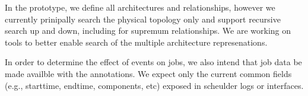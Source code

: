 In the prototype, we define all architectures and relationships,
however we currently prinipally search the physical topology only
and support recursive search up and down, including for supremum
relationships. We are working on tools to better enable search of
the multiple architecture represenations.

In order to determine the effect of events on jobs, we also
intend that job data be made availble with the annotations.
We expect only the current common fields (e.g., starttime,
endtime, components, etc) exposed in scheulder logs or
interfaces.







